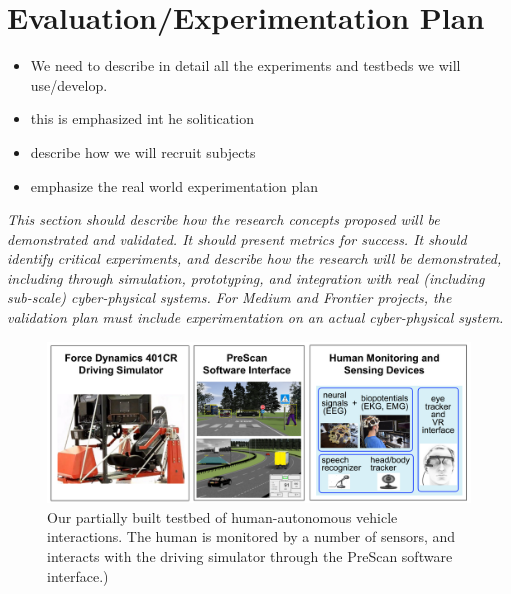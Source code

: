 \section{Evaluation/Experimentation Plan}
\label{sec:experiment}

\begin{itemize}
    \item We need to describe in detail all the experiments and testbeds we will use/develop.
    \item this is emphasized int he solitication
    \item describe how we will recruit subjects
    \item emphasize the real world experimentation plan
\end{itemize}

\textit{This section should describe how the research concepts proposed will be demonstrated and validated. It should present metrics for success. It should identify critical experiments, and describe how the research will be demonstrated, including through simulation, prototyping, and integration with real (including sub-scale) cyber-physical systems. For Medium and Frontier projects, the validation plan must include experimentation on an actual cyber-physical system.}


\begin{figure}[t]
\centering
\includegraphics[width=.9\textwidth]{figures/testbed}
\caption{Our partially built testbed of human-autonomous vehicle interactions. The human is monitored by a number of sensors, and interacts with the driving simulator through the PreScan software interface.)} 
\label{fig:testbed}
\end{figure}

